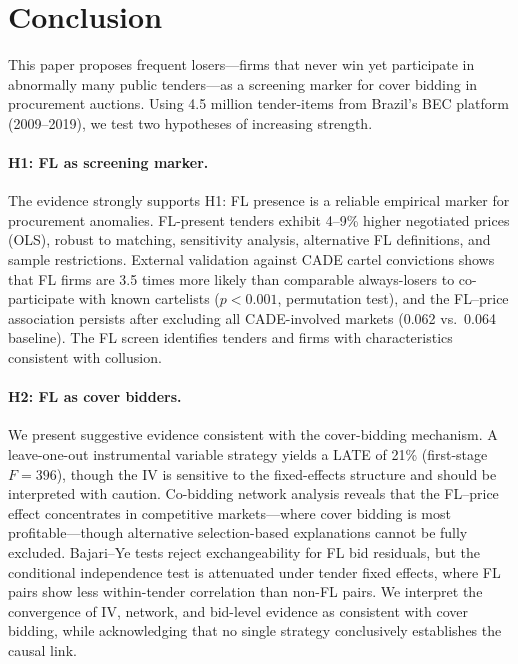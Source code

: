 \section{Conclusion}
\label{sec:conclusion}

This paper proposes frequent losers---firms that never win yet
participate in abnormally many public tenders---as a screening marker for
cover bidding in procurement auctions. Using 4.5 million tender-items
from Brazil's BEC platform (2009--2019), we test two hypotheses of
increasing strength.

\paragraph{H1: FL as screening marker.}
The evidence strongly supports H1: FL presence is a reliable empirical
marker for procurement anomalies. FL-present tenders exhibit 4--9\%
higher negotiated prices (OLS), robust to matching, sensitivity analysis,
alternative FL definitions, and sample restrictions. External validation
against CADE cartel convictions shows that FL firms are 3.5 times
more likely than comparable always-losers to co-participate with known
cartelists ($p < 0.001$, permutation test), and the FL--price
association persists after excluding all CADE-involved markets (0.062
vs.\ 0.064 baseline). The FL screen identifies tenders and firms with
characteristics consistent with collusion.

\paragraph{H2: FL as cover bidders.} %
We present suggestive evidence consistent with the cover-bidding
mechanism. A leave-one-out instrumental variable strategy yields a LATE
of 21\% (first-stage $F = 396$), though the IV is sensitive to the
fixed-effects structure and should be interpreted with caution.
Co-bidding network analysis reveals that the FL--price effect
concentrates in competitive markets---where cover bidding is most
profitable---though alternative selection-based explanations cannot be
fully excluded. Bajari--Ye tests reject exchangeability for FL bid
residuals, but the conditional independence test is attenuated under
tender fixed effects, where FL pairs show less within-tender correlation
than non-FL pairs. We interpret the convergence of IV, network, and
bid-level evidence as consistent with cover bidding, while acknowledging
that no single strategy conclusively establishes the causal link.

